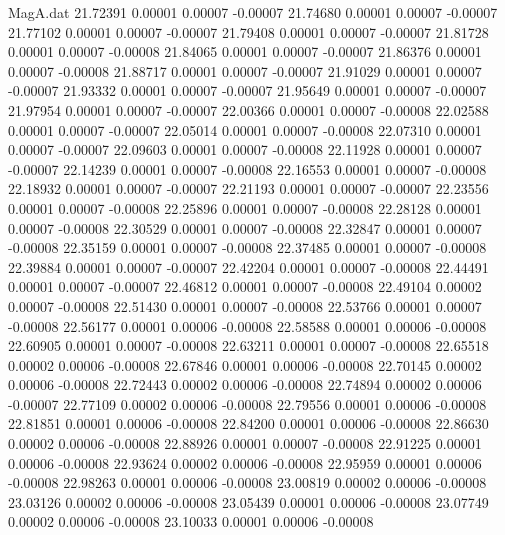 \begin{filecontents}{MagA.dat}
  21.72391    0.00001    0.00007   -0.00007
  21.74680    0.00001    0.00007   -0.00007
  21.77102    0.00001    0.00007   -0.00007
  21.79408    0.00001    0.00007   -0.00007
  21.81728    0.00001    0.00007   -0.00008
  21.84065    0.00001    0.00007   -0.00007
  21.86376    0.00001    0.00007   -0.00008
  21.88717    0.00001    0.00007   -0.00007
  21.91029    0.00001    0.00007   -0.00007
  21.93332    0.00001    0.00007   -0.00007
  21.95649    0.00001    0.00007   -0.00007
  21.97954    0.00001    0.00007   -0.00007
  22.00366    0.00001    0.00007   -0.00008
  22.02588    0.00001    0.00007   -0.00007
  22.05014    0.00001    0.00007   -0.00008
  22.07310    0.00001    0.00007   -0.00007
  22.09603    0.00001    0.00007   -0.00008
  22.11928    0.00001    0.00007   -0.00007
  22.14239    0.00001    0.00007   -0.00008
  22.16553    0.00001    0.00007   -0.00008
  22.18932    0.00001    0.00007   -0.00007
  22.21193    0.00001    0.00007   -0.00007
  22.23556    0.00001    0.00007   -0.00008
  22.25896    0.00001    0.00007   -0.00008
  22.28128    0.00001    0.00007   -0.00008
  22.30529    0.00001    0.00007   -0.00008
  22.32847    0.00001    0.00007   -0.00008
  22.35159    0.00001    0.00007   -0.00008
  22.37485    0.00001    0.00007   -0.00008
  22.39884    0.00001    0.00007   -0.00007
  22.42204    0.00001    0.00007   -0.00008
  22.44491    0.00001    0.00007   -0.00007
  22.46812    0.00001    0.00007   -0.00008
  22.49104    0.00002    0.00007   -0.00008
  22.51430    0.00001    0.00007   -0.00008
  22.53766    0.00001    0.00007   -0.00008
  22.56177    0.00001    0.00006   -0.00008
  22.58588    0.00001    0.00006   -0.00008
  22.60905    0.00001    0.00007   -0.00008
  22.63211    0.00001    0.00007   -0.00008
  22.65518    0.00002    0.00006   -0.00008
  22.67846    0.00001    0.00006   -0.00008
  22.70145    0.00002    0.00006   -0.00008
  22.72443    0.00002    0.00006   -0.00008
  22.74894    0.00002    0.00006   -0.00007
  22.77109    0.00002    0.00006   -0.00008
  22.79556    0.00001    0.00006   -0.00008
  22.81851    0.00001    0.00006   -0.00008
  22.84200    0.00001    0.00006   -0.00008
  22.86630    0.00002    0.00006   -0.00008
  22.88926    0.00001    0.00007   -0.00008
  22.91225    0.00001    0.00006   -0.00008
  22.93624    0.00002    0.00006   -0.00008
  22.95959    0.00001    0.00006   -0.00008
  22.98263    0.00001    0.00006   -0.00008
  23.00819    0.00002    0.00006   -0.00008
  23.03126    0.00002    0.00006   -0.00008
  23.05439    0.00001    0.00006   -0.00008
  23.07749    0.00002    0.00006   -0.00008
  23.10033    0.00001    0.00006   -0.00008

\end{filecontents}
